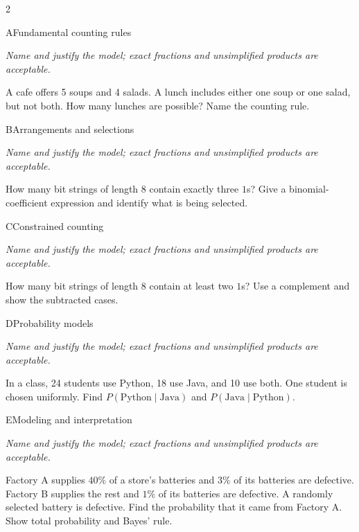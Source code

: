 \documentclass[9pt]{extarticle}
\begin{document}
\CoreWorkArea
\FormBreak
{}
\begin{multicols}{2}
\begin{CoreProblem}{A}{Fundamental counting rules}
{\scriptsize\textit{Name and justify the model; exact fractions and unsimplified products are acceptable.}\par}
A cafe offers 5 soups and 4 salads. A lunch includes either one soup
    or one salad, but not both. How many lunches are possible? Name the counting
    rule.
\end{CoreProblem}
\begin{CoreProblem}{B}{Arrangements and selections}
{\scriptsize\textit{Name and justify the model; exact fractions and unsimplified products are acceptable.}\par}
How many bit strings of length 8 contain exactly three $1$s? Give a
    binomial-coefficient expression and identify what is being selected.
\end{CoreProblem}
\begin{CoreProblem}{C}{Constrained counting}
{\scriptsize\textit{Name and justify the model; exact fractions and unsimplified products are acceptable.}\par}
How many bit strings of length 8 contain at least two $1$s? Use a
    complement and show the subtracted cases.
\end{CoreProblem}
\columnbreak
\begin{CoreProblem}{D}{Probability models}
{\scriptsize\textit{Name and justify the model; exact fractions and unsimplified products are acceptable.}\par}
In a class, 24 students use Python, 18 use Java, and 10 use both.
    One student is chosen uniformly. Find
    $P(\text{Python}\mid\text{Java})$ and
    $P(\text{Java}\mid\text{Python})$.
\end{CoreProblem}
\begin{CoreProblem}{E}{Modeling and interpretation}
{\scriptsize\textit{Name and justify the model; exact fractions and unsimplified products are acceptable.}\par}
Factory A supplies $40\%$ of a store's batteries and $3\%$ of its
    batteries are defective. Factory B supplies the rest and $1\%$ of its
    batteries are defective. A randomly selected battery is defective. Find the
    probability that it came from Factory A. Show total probability and Bayes'
    rule.
\end{CoreProblem}
\end{multicols}
\end{document}
